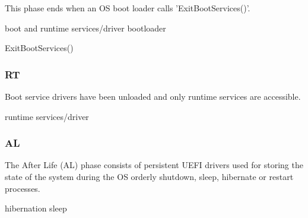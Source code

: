 This phase ends when an OS boot loader calls 'ExitBootServices()'.

boot and runtime services/driver
bootloader
\cite[Section 13.3]{uefi-spec}
\cite[Section 3.5.1.1]{uefi-spec}

ExitBootServices()

\subsubsection{\acf{RT}}
Boot service drivers have been unloaded and only runtime services are accessible.


runtime services/driver

\subsubsection{\acf{AL}}
The After Life (AL) phase consists of persistent UEFI drivers used for storing the state of the system during the OS orderly shutdown, sleep, hibernate or restart processes.

hibernation
sleep





